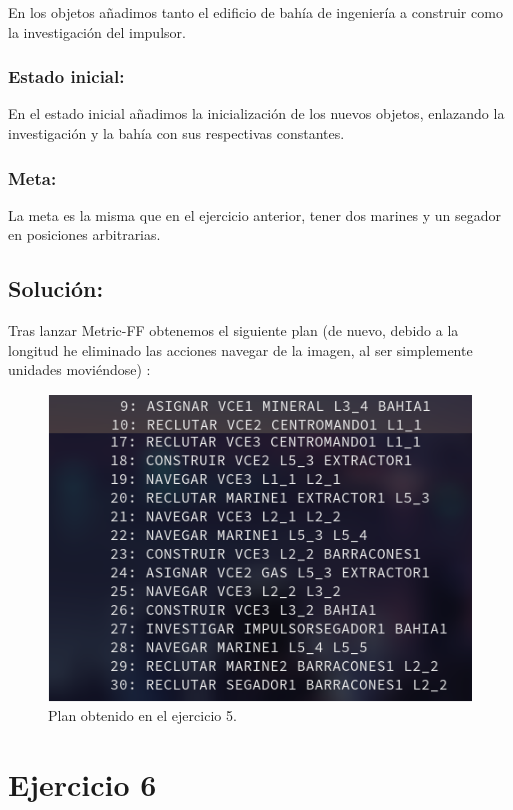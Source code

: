 \documentclass[10pt, spanish]{article}
\begin{document}
En los objetos añadimos tanto el edificio de bahía de ingeniería a construir como la investigación del impulsor.

\subsubsection{Estado inicial:}

En el estado inicial añadimos la inicialización de los nuevos objetos, enlazando la investigación y la bahía con sus respectivas constantes.

\subsubsection{Meta:}

La meta es la misma que en el ejercicio anterior, tener dos marines y un segador en posiciones arbitrarias.

\subsection{Solución:}

Tras lanzar Metric-FF obtenemos el siguiente plan (de nuevo, debido a la longitud he eliminado las acciones navegar de la imagen, al ser simplemente unidades moviéndose)  :



\begin{figure}[H]
	\centering
	\includegraphics[scale=0.4]{plan5.png}
	\caption{Plan obtenido en el ejercicio 5.}
	\label{plan5}
\end{figure}



\section{Ejercicio 6}
\end{document}

